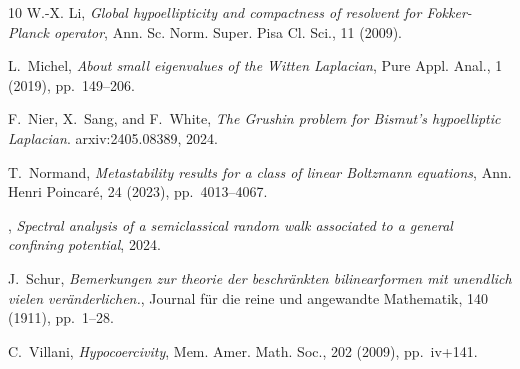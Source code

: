 \documentclass[12pt]{amsart}
\numberwithin{equation}{section}
\numberwithin{figure}{section}
\begin{document}
\begin{thebibliography}{10}
{\sc W.-X. Li}, {\em Global hypoellipticity and compactness of resolvent for {F}okker-{P}lanck operator}, Ann. Sc. Norm. Super. Pisa Cl. Sci., 11 (2009).

{\sc L.~Michel}, {\em {A}bout small eigenvalues of the {W}itten {L}aplacian}, Pure Appl. Anal., 1 (2019), pp.~149--206.

{\sc F.~Nier, X.~Sang, and F.~White}, {\em The {G}rushin problem for {B}ismut's hypoelliptic {L}aplacian}.
\newblock arxiv:2405.08389, 2024.

{\sc T.~Normand}, {\em Metastability results for a class of linear {B}oltzmann equations}, Ann. Henri Poincar\'{e}, 24 (2023), pp.~4013--4067.

\bysame, {\em Spectral analysis of a semiclassical random walk associated to a general confining potential}, 2024.

{\sc J.~Schur}, {\em Bemerkungen zur theorie der beschränkten bilinearformen mit unendlich vielen veränderlichen.}, Journal für die reine und angewandte Mathematik, 140 (1911), pp.~1--28.

{\sc C.~Villani}, {\em Hypocoercivity}, Mem. Amer. Math. Soc., 202 (2009), pp.~iv+141.
\end{thebibliography}
\end{document}
